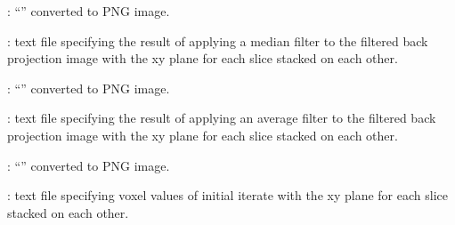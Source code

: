 \begin{tcbfunctionenv}
\begin{tcbparagraph}
\begin{deepList}[labelindent=1pt, leftmargin=*]
\begin{deepList}[labelindent=1pt, leftmargin=*]
\begin{deepList}[labelindent=1pt, leftmargin=*]
\begin{deepList}[labelindent=1pt, leftmargin=*]
\begin{deepList}[labelindent=1pt, leftmargin=*]
\begin{deepList}[labelindent=1pt, leftmargin=*]
\begin{deepList}[labelindent=1pt, leftmargin=*]
\begin{deepList}[labelindent=1pt, leftmargin=*]
\begin{deepList}[labelindent=1pt, leftmargin=*]
                                        \item {} : ``'' converted to PNG image.
                                        \item {} : text file specifying the result of applying a median filter to the filtered back projection image with the xy plane for each slice stacked on each other.
                                        \item {} : ``'' converted to PNG image.
                                        \item {} : text file specifying the result of applying an average filter to the filtered back projection image with the xy plane for each slice stacked on each other.
                                        \item {} : ``'' converted to PNG image.
                                        \item {} : text file specifying voxel values of initial iterate with the xy plane for each slice stacked on each other.

\end{deepList}
\end{deepList}
\end{deepList}
\end{deepList}
\end{deepList}
\end{deepList}
\end{deepList}
\end{deepList}
\end{deepList}
\end{tcbparagraph}
\end{tcbfunctionenv}
